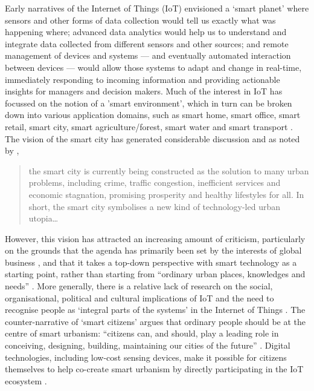 Early narratives of the Internet of Things (IoT) envisioned a ‘smart planet’
where sensors and other forms of data
collection would tell us exactly what was happening where;
advanced data analytics would help us to understand and integrate data
collected from different sensors and other sources; and remote
management of devices and systems --- and eventually automated
interaction between devices --- would allow those systems to adapt and
change in real-time, immediately responding to incoming information
and providing actionable insights for managers and decision makers.  
Much of the interest in IoT has focussed on the notion of a 'smart
environment', which in turn can be broken down into various
application domains, such as smart home, smart office, smart retail,
smart city, smart agriculture/forest, smart water and smart transport \cite{Gubbi-2013-IOT}.
The vision of the smart city has generated considerable discussion and
as noted by \cite{Hollands-2015-CIIT}, 
\begin{quote}
  the smart city is currently being constructed as the solution to
  many urban problems, including crime, traffic congestion, inefficient
  services and economic stagnation, promising prosperity and healthy
  lifestyles for all. In short, the smart city symbolises a new kind
  of technology-led urban utopia\ldots
\end{quote}

However, this vision has attracted an increasing amount of criticism,
particularly on the grounds that the agenda has primarily been set by the
interests of global business \cite{Hollands-2015-CIIT}, and that it
takes a top-down perspective with smart technology as a starting
point, rather than starting from ``ordinary urban places, knowledges
and needs'' \cite{Mcfarlane-2017-OASC}.  More generally, there is a
relative lack of research on the social, organisational, political and
cultural implications of IoT and the need to recognise people as
‘integral parts of the systems’ in the Internet of Things \cite{Shin-2014-ASTF}.  The
counter-narrative of `smart citizens' argues that ordinary people
should be at the centre of smart urbanism: ``citizens can, and should,
play a leading role in conceiving, designing, building, maintaining
our cities of the future'' \cite{Hemment-2013-SC,Hemment-2016-HTDU}.
Digital technologies, including low-cost sensing devices, make it
possible for citizens themselves to help co-create smart urbanism by
directly participating in the IoT ecosystem
\cite{Balestrini-2017-OCTT}.

